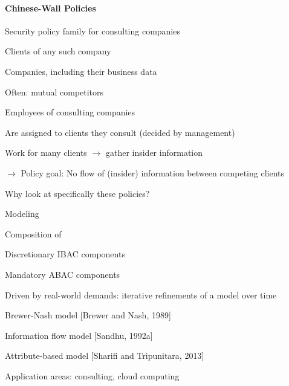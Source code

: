 \documentclass[a4paper]{article}
\begin{document}
\begin{multicols}{3}
    \paragraph{Chinese-Wall Policies}
    Security policy family for consulting companies
    \begin{itemize*}
        \item Clients of any such company
        \begin{itemize*}
            \item Companies, including their business data
            \item Often: mutual competitors
        \end{itemize*}
        \item Employees of consulting companies
        \begin{itemize*}
            \item Are assigned to clients they consult (decided by management)
            \item Work for many clients $\rightarrow$ gather insider information
        \end{itemize*}
        \item $\rightarrow$ Policy goal: No flow of (insider) information between competing clients
    \end{itemize*}

    Why look at specifically these policies?
    \begin{itemize*}
        \item Modeling
        \begin{itemize*}
            \item Composition of
            \begin{itemize*}
                \item Discretionary IBAC components
                \item Mandatory ABAC components
            \end{itemize*}
            \item Driven by real-world demands: iterative refinements of a model over time
            \begin{itemize*}
                \item Brewer-Nash model [Brewer and Nash, 1989]
                \item Information flow model [Sandhu, 1992a]
                \item Attribute-based model [Sharifi and Tripunitara, 2013]
            \end{itemize*}
            \item Application areas: consulting, cloud computing
        \end{itemize*}
    \end{itemize*}


\end{multicols}
\end{document}
